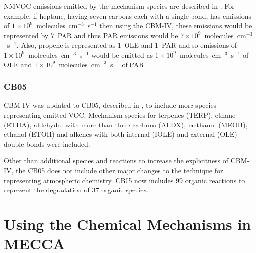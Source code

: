 NMVOC emissions emitted by the mechanism species are described in \citet{Hogo:1989}.
For example, if heptane, having seven carbons each with a single bond, has emissions of $1 \times 10^9$~molecules~cm$^{-3}$~s$^{-1}$ then using the CBM-IV, these emissions would be represented by $7$~PAR and thus PAR emissions would be $7 \times 10^9$~molecules~cm$^{-3}$~s$^{-1}$.
Also, propene is represented as $1$~OLE and $1$~PAR and so emissions of $1 \times 10^9$~molecules~cm$^{-3}$~s$^{-1}$  would be emitted as $1 \times 10^9$~molecules~cm$^{-3}$~s$^{-1}$ of OLE and $1 \times 10^9$~molecules~cm$^{-3}$~s$^{-1}$ of PAR.

\subsubsection{CB05}
CBM-IV was updated to CB05, described in \citet{Yarwood:2005}, to include more species representing emitted VOC.
Mechanism species for terpenes (TERP), ethane (ETHA), aldehydes with more than three carbons (ALDX), methanol (MEOH), ethanol (ETOH) and alkenes with both internal (IOLE) and external (OLE) double bonds were included.

Other than additional species and reactions to increase the explicitness of CBM-IV, the CB05 does not include other major changes to the technique for representing atmospheric chemistry. 
CB05 now includes $99$ organic reactions to represent the degradation of $37$ organic species.

\section{Using the Chemical Mechanisms in MECCA}
